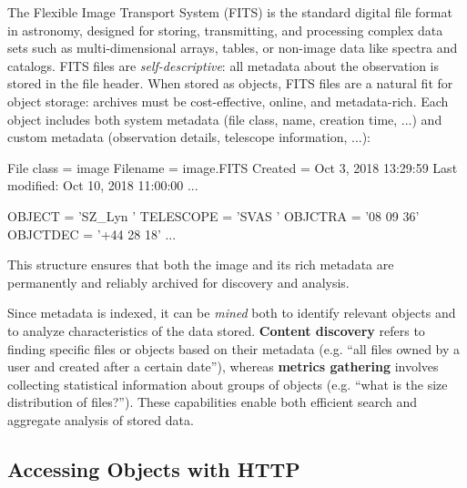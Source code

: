 \begin{observationblock}
    The Flexible Image Transport System (FITS) is the standard digital file format in astronomy, designed for storing, transmitting, and processing complex data sets such as multi-dimensional arrays, tables, or non-image data like spectra and catalogs. FITS files are \emph{self-descriptive}: all metadata about the observation is stored in the file header. When stored as objects, FITS files are a natural fit for object storage: archives must be cost-effective, online, and metadata-rich. Each  object includes both system metadata (file class, name, creation time, ...) and custom metadata (observation details, telescope information, ...):
    \begin{minipage}[t]{0.47\textwidth}
        \begin{codeblock}[language=bash, basicstyle=\ttfamily\scriptsize]
File class = image
Filename   = image.FITS
Created    = Oct  3, 2018 13:29:59
Last modified: Oct 10, 2018 11:00:00
...
        \end{codeblock}
    \end{minipage}\hfill
    \begin{minipage}[t]{0.47\textwidth}
        \begin{codeblock}[language=bash, basicstyle=\ttfamily\scriptsize, firstnumber=5]
OBJECT   = 'SZ_Lyn '
TELESCOPE = 'SVAS '
OBJCTRA  = '08 09 36'
OBJCTDEC = '+44 28 18'
...
        \end{codeblock}
    \end{minipage}
    This structure ensures that both the image and its rich metadata are permanently and reliably archived for discovery and analysis.
\end{observationblock}

Since metadata is indexed, it can be \emph{mined} both to identify relevant objects and to analyze characteristics of the data stored. \textbf{Content discovery} refers to finding specific files or objects based on their metadata (e.g. ``all files owned by a user and created after a certain date''), whereas \textbf{metrics gathering} involves collecting statistical information about groups of objects (e.g. ``what is the size distribution of files?''). These capabilities enable both efficient search and aggregate analysis of stored data.

\subsection{Accessing Objects with HTTP}


